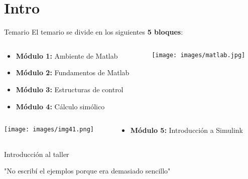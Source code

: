 \documentclass{bredelebeamer}
\begin{document}



\section{Intro}

\begin{frame}{Temario}
El temario se divide en los siguientes \textbf{5 bloques}:
\begin{columns}
\begin{column}{0.5\textwidth}
\begin{itemize}
\item \textbf{Módulo 1:} Ambiente de Matlab 
\item \textbf{Módulo 2:} Fundamentos de Matlab 
\item \textbf{Módulo 3:} Estructuras de control
\item \textbf{Módulo 4:} Cálculo simólico
\end{itemize}
\end{column}
\begin{column}{0.3\textwidth}
\begin{center}
\texttt{[image: images/matlab.jpg]}
\end{center}
\end{column}
\end{columns}
\begin{columns}
\begin{column}{0.3\textwidth}
\begin{center}
\texttt{[image: images/img41.png]}
\end{center}
\end{column}
\begin{column}{0.5\textwidth}
\begin{itemize}
\item \textbf{Módulo 5:} Introducción a Simulink
\end{itemize}
\end{column}
\end{columns}
\end{frame}

\begin{frame}{Introducción al taller}
\begin{large}
\begin{center}
"No escribí el ejemplos porque era demasiado sencillo"
\end{center}
\end{large}
\end{frame}
\end{document}
